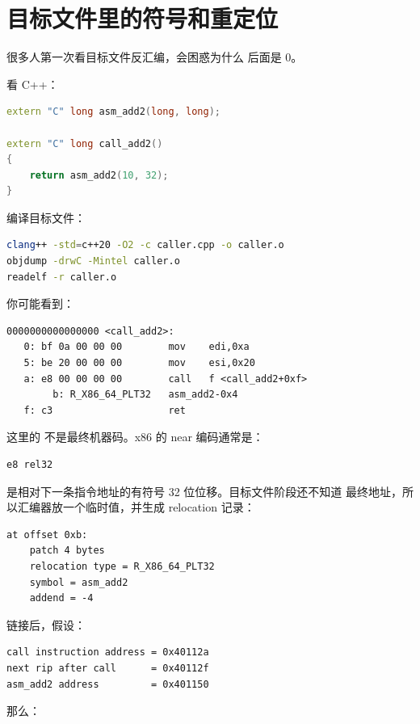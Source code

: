 \section{目标文件里的符号和重定位}

很多人第一次看目标文件反汇编，会困惑为什么  后面是 0。

看 C++：

\begin{lstlisting}[language=C++]
extern "C" long asm_add2(long, long);

extern "C" long call_add2()
{
    return asm_add2(10, 32);
}
\end{lstlisting}

编译目标文件：

\begin{lstlisting}[language=bash]
clang++ -std=c++20 -O2 -c caller.cpp -o caller.o
objdump -drwC -Mintel caller.o
readelf -r caller.o
\end{lstlisting}

你可能看到：

\begin{lstlisting}
0000000000000000 <call_add2>:
   0: bf 0a 00 00 00        mov    edi,0xa
   5: be 20 00 00 00        mov    esi,0x20
   a: e8 00 00 00 00        call   f <call_add2+0xf>
        b: R_X86_64_PLT32   asm_add2-0x4
   f: c3                    ret
\end{lstlisting}

这里的  不是最终机器码。x86 的 near  编码通常是：

\begin{lstlisting}
e8 rel32
\end{lstlisting}

 是相对下一条指令地址的有符号 32 位位移。目标文件阶段还不知道  最终地址，所以汇编器放一个临时值，并生成 relocation 记录：

\begin{lstlisting}
at offset 0xb:
    patch 4 bytes
    relocation type = R_X86_64_PLT32
    symbol = asm_add2
    addend = -4
\end{lstlisting}

链接后，假设：

\begin{lstlisting}
call instruction address = 0x40112a
next rip after call      = 0x40112f
asm_add2 address         = 0x401150
\end{lstlisting}

那么：

